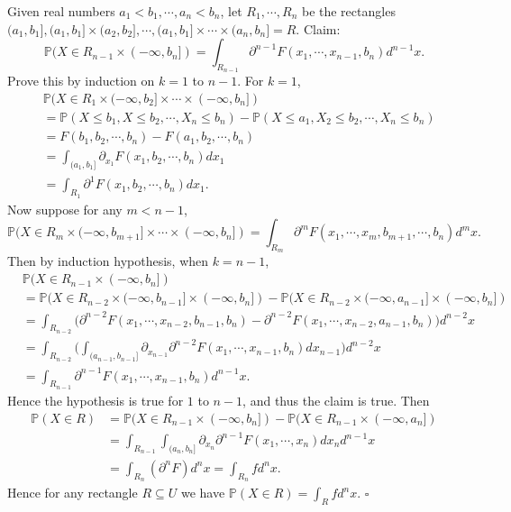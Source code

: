 \begin{answer}
Given real numbers $a_1<b_1,\cdots,a_n<b_n$, let $R_1,\cdots,R_n$ be the rectangles $(a_1,b_1],(a_1,b_1]\times(a_2,b_2],\cdots,(a_1,b_1]\times\cdots\times(a_n,b_n]=R$. Claim:
\begin{equation*}
    \mathbb{P}(X\in R_{n-1}\times(-\infty,b_n])=\int_{R_{n-1}}\partial^{n-1}F(x_1,\cdots,x_{n-1},b_n)d^{n-1}x.
\end{equation*}
Prove this by induction on $k=1$ to $n-1$. For $k=1$, 
\begin{equation*}
    \begin{aligned}
        &\mathbb{P}(X\in R_1\times(-\infty,b_2]\times\cdots\times(-\infty,b_n])\\&=\mathbb{P}(X\leq b_1,X\leq b_2,\cdots,X_n\leq b_n)-\mathbb{P}(X\leq a_1,X_2\leq b_2,\cdots,X_n\leq b_n)\\&=F(b_1,b_2,\cdots,b_n)-F(a_1,b_2,\cdots,b_n)\\&
        =\int_{(a_1,b_1]}\partial_{x_1}F(x_1,b_2,\cdots,b_n)dx_1\\&
        =\int_{R_1}\partial^1 F(x_1,b_2,\cdots,b_n)d x_1.
    \end{aligned}
\end{equation*}
Now suppose for any $m<n-1$,
\begin{equation*}
    \mathbb{P}(X\in R_m\times(-\infty,b_{m+1}]\times\cdots\times(-\infty,b_n])=\int_{R_m}\partial^{m}F(x_1,\cdots,x_m,b_{m+1},\cdots,b_n)d^m x.
\end{equation*}
Then by induction hypothesis, when $k=n-1$,
\begin{equation*}
    \begin{aligned}
        &\mathbb{P}(X\in R_{n-1}\times(-\infty,b_n])\\&=\mathbb{P}(X\in R_{n-2}\times(-\infty,b_{n-1}]\times(-\infty,b_n])-\mathbb{P}(X\in R_{n-2}\times(-\infty,a_{n-1}]\times(-\infty,b_n])\\&
        =\int_{R_{n-2}}\big(\partial^{n-2}F(x_1,\cdots,x_{n-2},b_{n-1},b_n)-\partial^{n-2}F(x_1,\cdots,x_{n-2},a_{n-1},b_n)\big)d^{n-2}x\\&
        =\int_{R_{n-2}}\Big(\int_{(a_{n-1},b_{n-1}]}\partial_{x_{n-1}}\partial^{n-2}F(x_1,\cdots,x_{n-1},b_n)dx_{n-1}\Big) d^{n-2}x\\&
        =\int_{R_{n-1}}\partial^{n-1}F(x_1,\cdots,x_{n-1},b_n)d^{n-1}x.
    \end{aligned}
\end{equation*}
Hence the hypothesis is true for $1$ to $n-1$, and thus the claim is true. Then
\begin{equation*}
    \begin{aligned}
        \mathbb{P}(X\in R)&=\mathbb{P}(X\in R_{n-1}\times(-\infty,b_n])-\mathbb{P}(X\in R_{n-1}\times(-\infty,a_n])\\&
        =\int_{R_{n-1}}\int_{(a_n,b_n]}\partial_{x_n}\partial^{n-1}F(x_1,\cdots,x_n)dx_n d^{n-1}x\\&
        =\int_{R_n}(\partial^n F)d^n x=\int_{R_n}f d^n x.
    \end{aligned}
\end{equation*}
Hence for any rectangle $R\subseteq U$ we have $\mathbb{P}(X\in R)=\int_R f d^n x$. $\square$


\end{answer}
